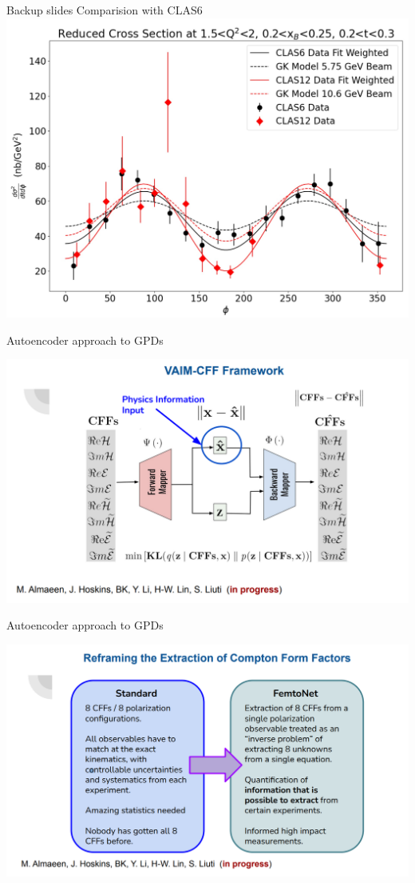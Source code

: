 \documentclass[aspectratio=169]{beamer}
\begin{document}
\begin{frame}{Backup slides}
\centering
Comparision with CLAS6\\

    \includegraphics[scale=0.2832]{DNP/comp_c12_gk_c6.jpg}\\
\end{frame}



\begin{frame}{Autoencoder approach to GPDs}

  \includegraphics[scale=0.52832]{janres/vain1.png}
\end{frame}


\begin{frame}{Autoencoder approach to GPDs}

  \includegraphics[scale=0.52832]{janres/vain2.png}
\end{frame}
\end{document}

